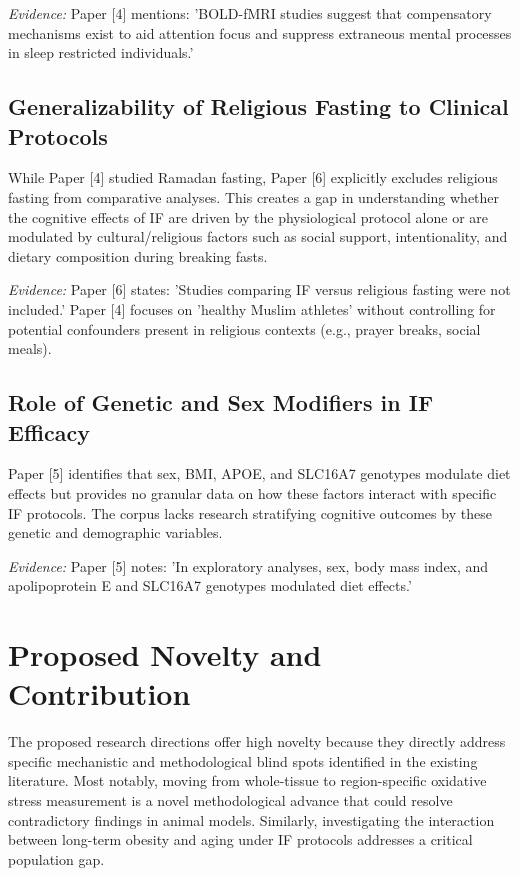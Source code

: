\documentclass[11pt]{article}
\begin{document}
\textit{Evidence:} Paper [4] mentions: 'BOLD-fMRI studies suggest that compensatory mechanisms exist to aid attention focus and suppress extraneous mental processes in sleep restricted individuals.'

\subsection{Generalizability of Religious Fasting to Clinical Protocols}
While Paper [4] studied Ramadan fasting, Paper [6] explicitly excludes religious fasting from comparative analyses. This creates a gap in understanding whether the cognitive effects of IF are driven by the physiological protocol alone or are modulated by cultural/religious factors such as social support, intentionality, and dietary composition during breaking fasts.

\textit{Evidence:} Paper [6] states: 'Studies comparing IF versus religious fasting were not included.' Paper [4] focuses on 'healthy Muslim athletes' without controlling for potential confounders present in religious contexts (e.g., prayer breaks, social meals).

\subsection{Role of Genetic and Sex Modifiers in IF Efficacy}
Paper [5] identifies that sex, BMI, APOE, and SLC16A7 genotypes modulate diet effects but provides no granular data on how these factors interact with specific IF protocols. The corpus lacks research stratifying cognitive outcomes by these genetic and demographic variables.

\textit{Evidence:} Paper [5] notes: 'In exploratory analyses, sex, body mass index, and apolipoprotein E and SLC16A7 genotypes modulated diet effects.'

\section{Proposed Novelty and Contribution}
The proposed research directions offer high novelty because they directly address specific mechanistic and methodological blind spots identified in the existing literature. Most notably, moving from whole-tissue to region-specific oxidative stress measurement is a novel methodological advance that could resolve contradictory findings in animal models. Similarly, investigating the interaction between long-term obesity and aging under IF protocols addresses a critical population gap.
\end{document}
